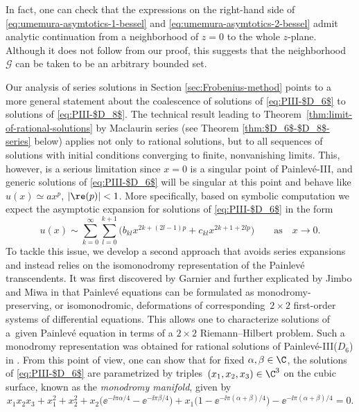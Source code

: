 In fact, one can check that the expressions on the right-hand side of \eqref{eq:umemura-asymtotics-1-bessel} and \eqref{eq:umemura-asymtotics-2-bessel} admit analytic continuation from a neighborhood of $z=0$ to the whole $z$-plane. Although it does not follow from our proof, this suggests that the neighborhood $\mathcal{G}$ can be taken to be an arbitrary bounded set.

Our analysis of series solutions in Section \ref{sec:Frobenius-method} points to a more general statement about the coalescence of solutions of \eqref{eq:PIII-$D_6$} to solutions of \eqref{eq:PIII-$D_8$}. The technical result leading to Theorem~\ref{thm:limit-of-rational-solutions} by Maclaurin series (see Theorem \ref{thm:$D_6$-$D_8$-series} below) applies not only to rational solutions, but to all sequences of solutions with initial conditions converging to finite, nonvanishing limits. This, however, is a serious limitation since $x = 0$ is a singular point of Painlev\'e-III, and generic solutions of \eqref{eq:PIII-$D_6$} will be singular at this point and behave like $u(x)\simeq ax^p$, $|{\re}(p)|< 1$. More specifically, based on symbolic computation we expect the asymptotic expansion for solutions of \eqref{eq:PIII-$D_6$} in the form
\[
u(x)\sim \sum_{k=0}^{\infty}\sum_{l=0}^{k+1}\big(b_{kl}x^{2k+(2l-1)p}+c_{kl}x^{2k+1+2lp}\big) \qquad \text{as}\quad x\to 0.
\]
To tackle this issue, we develop a second approach that avoids series expansions and instead relies on the isomonodromy representation of the Painlev\'e transcendents. It was first discovered by Garnier \cite{MR1509146} and further explicated by Jimbo and Miwa in \cite{MR625446} that Painlev\'e equations can be formulated as monodromy-preserving, or isomonodromic, deformations of corresponding~${2 \times 2}$ first-order systems of differential equations. This allows one to characterize solutions of a~given Painlev\'e equation in terms of a $2\times 2$ Riemann--Hilbert problem. Such a monodromy representation was obtained for rational solutions of Painlev\'e-III($D_6$) in \cite{BMS18}. From this point of view, one can show that for fixed $\alpha, \beta \in \C$, the solutions of \eqref{eq:PIII-$D_6$} are parametrized by triples~$(x_1, x_2, x_3) \in \C^3$ on the cubic surface, known as the \emph{monodromy manifold}, given by
\begin{equation}
 \label{eq:cubic-D6} x_1x_2x_3+x_1^2+x_2^2+x_2 \bigl(\ee^{-{\ii\pi \alpha}/{4}}-\ee^{-{\ii\pi \beta}/{4}} \bigr)+x_1 \bigl(1-\ee^{-{\ii\pi(\alpha+ \beta)}/{4}}\bigr)-\ee^{-{\ii\pi(\alpha+ \beta)}/{4}}=0.
\end{equation}
